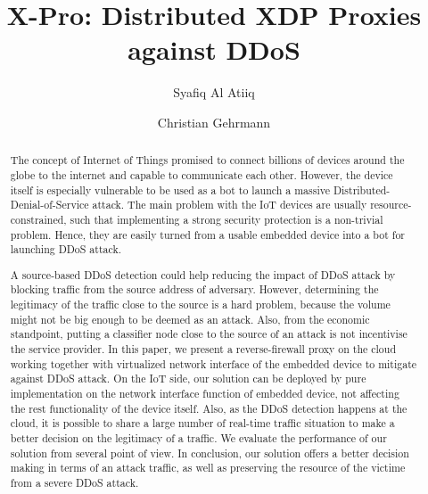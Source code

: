 \documentclass[sigplan,screen]{acmart}
\begin{document}
\title{X-Pro: Distributed XDP Proxies against DDoS}

\author{Syafiq Al Atiiq}
\author{Christian Gehrmann}

\begin{abstract}
The concept of Internet of Things promised to connect billions of devices around the globe to the internet and capable to communicate each other. However, the device itself is especially vulnerable to be used as a bot to launch a massive Distributed-Denial-of-Service attack. The main problem with the IoT devices are usually resource-constrained, such that implementing a strong security protection is a non-trivial problem. Hence, they are easily turned from a usable embedded device into a bot for launching DDoS attack. 

A source-based DDoS detection could help reducing the impact of DDoS attack by blocking traffic from the source address of adversary. However, determining the legitimacy of the traffic close to the source is a hard problem, because the volume might not be big enough to be deemed as an attack. Also, from the economic standpoint, putting a classifier node close to the source of an attack is not incentivise the service provider. In this paper, we present a reverse-firewall proxy on the cloud working together with virtualized network interface of the embedded device to mitigate against DDoS attack. On the IoT side, our solution can be deployed by pure implementation on the network interface function of embedded device, not affecting the rest functionality of the device itself. Also, as the DDoS detection happens at the cloud, it is possible to share a large number of real-time traffic situation to make a better decision on the legitimacy of a traffic. We evaluate the performance of our solution from several point of view. In conclusion, our solution offers a better decision making in terms of an attack traffic, as well as preserving the resource of the victime from a severe DDoS attack.  
\end{abstract}
\end{document}

